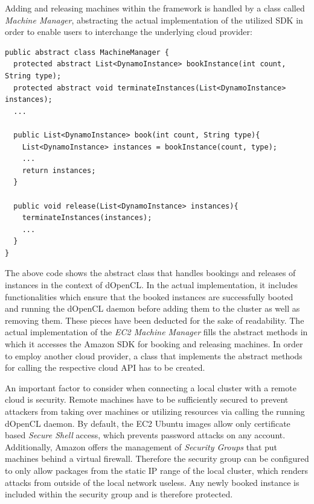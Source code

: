 Adding and releasing machines within the framework is handled by a class called \textit{Machine Manager}, abstracting the actual implementation of the utilized SDK in order to enable users to interchange the underlying cloud provider:


\begin{lstlisting}[caption=Machine Manager Abstract Implementation,captionpos=b]
public abstract class MachineManager {
  protected abstract List<DynamoInstance> bookInstance(int count, String type);
  protected abstract void terminateInstances(List<DynamoInstance> instances);
  ...

  public List<DynamoInstance> book(int count, String type){
    List<DynamoInstance> instances = bookInstance(count, type);
    ...
    return instances;
  }

  public void release(List<DynamoInstance> instances){
    terminateInstances(instances);
    ...
  }
}
\end{lstlisting}

The above code shows the abstract class that handles bookings and releases of instances in the context of dOpenCL. In the actual implementation, it includes functionalities which ensure that the booked instances are successfully booted and running the dOpenCL daemon before adding them to the cluster as well as removing them. These pieces have been deducted for the sake of readability. The actual implementation of the \textit{EC2 Machine Manager} fills the abstract methods in which it accesses the Amazon SDK for booking and releasing machines. In order to employ another cloud provider, a class that implements the abstract methods for calling the respective cloud API has to be created.

An important factor to consider when connecting a local cluster with a remote cloud is security. Remote machines have to be sufficiently secured to prevent attackers from taking over machines or utilizing resources via calling the running dOpenCL daemon. By default, the EC2 Ubuntu images allow only certificate based \textit{Secure Shell} access, which prevents password attacks on any account. Additionally, Amazon offers the management of \textit{Security Groups} that put machines behind a virtual firewall. Therefore the security group can be configured to only allow packages from the static IP range of the local cluster, which renders attacks from outside of the local network useless. Any newly booked instance is included within the security group and is therefore protected.

